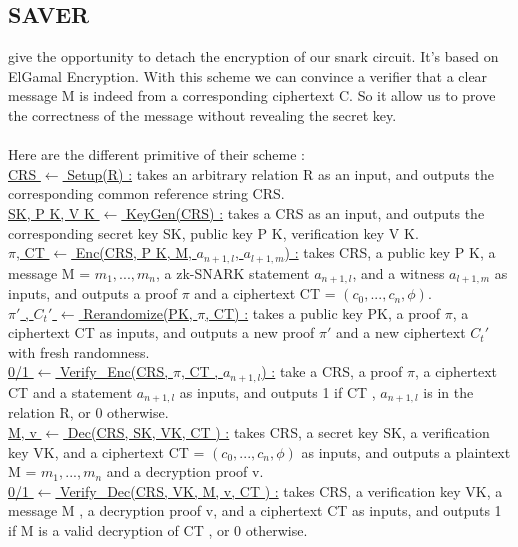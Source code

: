 \subsection{SAVER}
\cite{saver} give the opportunity to detach the encryption of our snark circuit. It's based on ElGamal Encryption. With this scheme we can convince a verifier that a clear message M is indeed from a corresponding ciphertext C. So it allow us to prove the correctness of the message without revealing the secret key.
\\\\Here are the different primitive of their scheme :
\\\underline{CRS $\leftarrow$ Setup(R) :} takes an arbitrary relation R as an input, and
outputs the corresponding common reference string CRS.
\\\underline{SK, P K, V K $\leftarrow$ KeyGen(CRS) :} takes a CRS as an input, and outputs the
corresponding secret key SK, public key P K, verification key V K.
\\\underline{$\pi$, CT $\leftarrow$ Enc(CRS, P K, M, $a_{n+1,l}$, $a_{l+1,m}$) :} takes CRS, a public key P K, a message M = $m_1,..., m_n$, a zk-SNARK statement $a_{n+1,l}$, and a witness
$a_{l+1,m}$ as inputs, and outputs a proof $\pi$ and a ciphertext CT = $(c_0 ,... , c_n , \phi)$.
\\ \underline{$\pi'$ , $C_t'$ $\leftarrow$ Rerandomize(PK, $\pi$, CT) :} takes a public key PK, a proof $\pi$, a
ciphertext CT as inputs, and outputs a new proof $\pi'$ and a new ciphertext $C_t'$ with fresh randomness.
\\\underline{0/1 $\leftarrow$ Verify\_Enc(CRS, $\pi$, CT , $a_{n+1,l}$) :} take a CRS, a proof $\pi$, a ciphertext CT and a statement  $a_{n+1,l}$ as inputs, and outputs 1 if CT , $a_{n+1,l}$ is in
the relation R, or 0 otherwise.
\\ \underline{M, v $\leftarrow$ Dec(CRS, SK, VK, CT ) :} takes CRS, a secret key SK, a verification key VK, and a ciphertext CT = $(c_0 ,... , c_n , \phi)$ as inputs, and outputs a plaintext M = $m_1,..., m_n$ and a decryption proof v.
\\ \underline{0/1 $\leftarrow$ Verify\_Dec(CRS, VK, M, v, CT ) :} takes CRS, a verification key VK, a message M , a decryption proof v, and a ciphertext CT as inputs, and outputs 1 if M is a valid decryption of CT , or 0 otherwise.